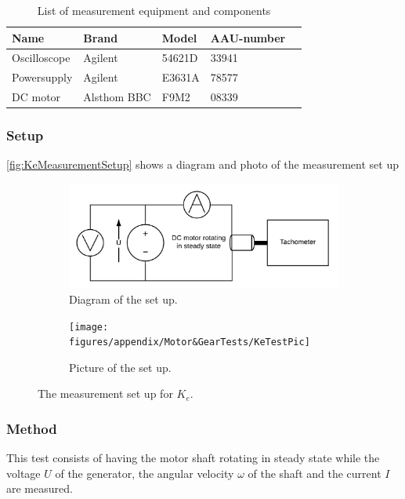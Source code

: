 \begin{table}[htbp]
	\centering
	\caption{List of measurement equipment and components}\label{tab_appendix:KeSetUp}
	
	\begin{tabularx}{\textwidth}{lXXXX}
		Name 				& Brand	& Model & AAU-number									\\ \toprule \rowcolor{lightGrey}
		Oscilloscope	& Agilent & 54621D & 33941 	\\
		Powersupply	& Agilent & E3631A & 78577\\ \rowcolor{lightGrey}
		DC motor & Alsthom BBC & F9M2& 08339
	\end{tabularx}
\end{table}

\subsubsection*{Setup}
\autoref{fig:KeMeasurementSetup} shows a diagram and photo of the measurement set up
\begin{figure}[htbp]
	\centering
	\begin{subfigure}{0.50\textwidth}
		\includegraphics[width=\textwidth]{figures/appendix/Motor&GearTests/KeTestSetUp}
		\caption{Diagram of the set up.} \label{fig:KeMeasurementDiagram}
	\end{subfigure}
	\begin{subfigure}{0.30\textwidth}
		\texttt{[image: figures/appendix/Motor\&GearTests/KeTestPic]}
		\caption{Picture of the set up.} \label{fig:KeMeasurementPictures}
	\end{subfigure}
	\caption{The measurement set up for $K_e$.} \label{fig:KeMeasurementSetup}   
\end{figure}

\subsubsection*{Method}
This test consists of having the motor shaft rotating in steady state while the voltage $U$ of the generator, the angular velocity $\omega$ of the shaft and the current $I$ are measured.

